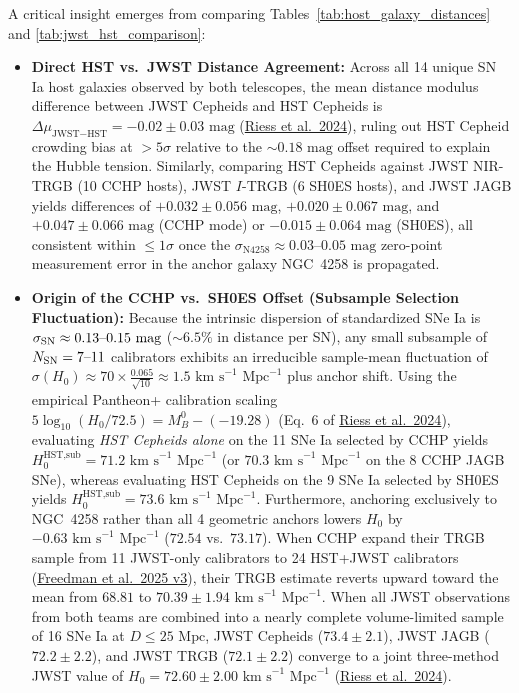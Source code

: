 \documentclass[11pt,letterpaper]{article}
\begin{document}
A critical insight emerges from comparing Tables~\ref{tab:host_galaxy_distances} and \ref{tab:jwst_hst_comparison}:
\begin{itemize}
    \setlength{\itemsep}{3pt}
    \item \textbf{Direct HST vs.\ JWST Distance Agreement:} Across all 14 unique SN Ia host galaxies observed by both telescopes, the mean distance modulus difference between JWST Cepheids and HST Cepheids is $\Delta\mu_{\text{JWST}-\text{HST}} = -0.02 \pm 0.03\text{ mag}$ (\href{https://arxiv.org/abs/2408.11770}{Riess et al.\ 2024}), ruling out HST Cepheid crowding bias at $>5\sigma$ relative to the $\sim 0.18\text{ mag}$ offset required to explain the Hubble tension. Similarly, comparing HST Cepheids against JWST NIR-TRGB (10 CCHP hosts), JWST $I$-TRGB (6 SH0ES hosts), and JWST JAGB yields differences of $+0.032 \pm 0.056\text{ mag}$, $+0.020 \pm 0.067\text{ mag}$, and $+0.047 \pm 0.066\text{ mag}$ (CCHP mode) or $-0.015 \pm 0.064\text{ mag}$ (SH0ES), all consistent within $\le 1\sigma$ once the $\sigma_{\text{N4258}} \approx 0.03\text{--}0.05\text{ mag}$ zero-point measurement error in the anchor galaxy NGC~4258 is propagated.
    \item \textbf{Origin of the CCHP vs.\ SH0ES Offset (Subsample Selection Fluctuation):} Because the intrinsic dispersion of standardized SNe Ia is $\sigma_{\rm SN} \approx 0.13\text{--}0.15\text{ mag}$ ($\sim 6.5\%$ in distance per SN), any small subsample of $N_{\rm SN} = 7\text{--}11$ calibrators exhibits an irreducible sample-mean fluctuation of $\sigma(H_0) \approx 70 \times \frac{0.065}{\sqrt{10}} \approx 1.5\text{ km s}^{-1}\text{ Mpc}^{-1}$ plus anchor shift. Using the empirical Pantheon+ calibration scaling $5\log_{10}(H_0/72.5) = M_B^0 - (-19.28)$ (Eq.~6 of \href{https://arxiv.org/abs/2408.11770}{Riess et al.\ 2024}), evaluating \emph{HST Cepheids alone} on the 11 SNe Ia selected by CCHP yields $H_0^{\text{HST,sub}} = 71.2\text{ km s}^{-1}\text{ Mpc}^{-1}$ (or $70.3\text{ km s}^{-1}\text{ Mpc}^{-1}$ on the 8 CCHP JAGB SNe), whereas evaluating HST Cepheids on the 9 SNe Ia selected by SH0ES yields $H_0^{\text{HST,sub}} = 73.6\text{ km s}^{-1}\text{ Mpc}^{-1}$. Furthermore, anchoring exclusively to NGC~4258 rather than all 4 geometric anchors lowers $H_0$ by $-0.63\text{ km s}^{-1}\text{ Mpc}^{-1}$ ($72.54$ vs.\ $73.17$). When CCHP expand their TRGB sample from 11 JWST-only calibrators to 24 HST+JWST calibrators (\href{https://arxiv.org/abs/2408.06153}{Freedman et al.\ 2025 v3}), their TRGB estimate reverts upward toward the mean from $68.81$ to $70.39 \pm 1.94\text{ km s}^{-1}\text{ Mpc}^{-1}$. When all JWST observations from both teams are combined into a nearly complete volume-limited sample of 16 SNe Ia at $D \le 25\text{ Mpc}$, JWST Cepheids ($73.4 \pm 2.1$), JWST JAGB ($72.2 \pm 2.2$), and JWST TRGB ($72.1 \pm 2.2$) converge to a joint three-method JWST value of $H_0 = 72.60 \pm 2.00\text{ km s}^{-1}\text{ Mpc}^{-1}$ (\href{https://arxiv.org/abs/2408.11770}{Riess et al.\ 2024}).
\end{itemize}
\end{document}
